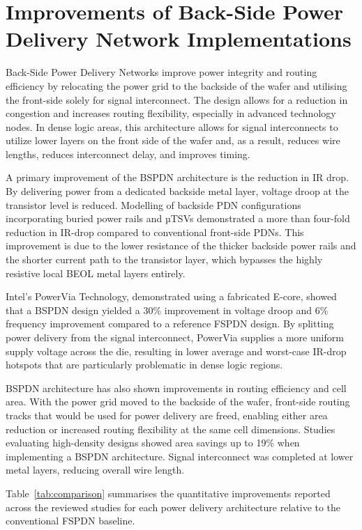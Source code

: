 \section{Improvements of Back-Side Power Delivery Network Implementations}

Back-Side Power Delivery Networks improve power integrity and routing efficiency by relocating the power grid to the backside of the wafer and utilising the front-side solely for signal interconnect. The design allows for a reduction in congestion and increases routing flexibility, especially in advanced technology nodes\cite{10631463}. In dense logic areas, this architecture allows for signal interconnects to utilize lower layers on the front side of the wafer and, as a result, reduces wire lengths, reduces interconnect delay, and improves timing\cite{11192533}.

A primary improvement of the BSPDN architecture is the reduction in IR drop. By delivering power from a dedicated backside metal layer, voltage droop at the transistor level is reduced. Modelling of backside PDN configurations incorporating buried power rails and µTSVs demonstrated a more than four-fold reduction in IR-drop compared to conventional front-side PDNs\cite{8932458}. This improvement is due to the lower resistance of the thicker backside power rails and the shorter current path to the transistor layer, which bypasses the highly resistive local BEOL metal layers entirely.

Intel's PowerVia Technology, demonstrated using a fabricated E-core, showed that a BSPDN design yielded a 30\% improvement in voltage droop and 6\% frequency improvement compared to a reference FSPDN design\cite{10185208}. By splitting power delivery from the signal interconnect, PowerVia supplies a more uniform supply voltage across the die, resulting in lower average and worst-case IR-drop hotspots that are particularly problematic in dense logic regions\cite{10185208}.

BSPDN architecture has also shown improvements in routing efficiency and cell area. With the power grid moved to the backside of the wafer, front-side routing tracks that would be used for power delivery are freed, enabling either area reduction or increased routing flexibility at the same cell dimensions. Studies evaluating high-density designs showed area savings up to 19\% when implementing a BSPDN architecture. Signal interconnect was completed at lower metal layers, reducing overall wire length\cite{10631463}.

Table~\ref{tab:comparison} summarises the quantitative improvements reported across the reviewed studies for each power delivery architecture relative to the conventional FSPDN baseline.


